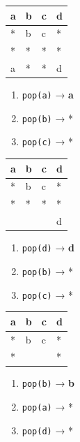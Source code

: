 \documentclass[11pt]{article}
\providecommand{\tightlist}{%
      \setlength{\itemsep}{0pt}\setlength{\parskip}{0pt}}
\begin{document}
\begin{longtable}[]{@{}llll@{}}
\toprule\noalign{}
a & b & c & d \\
\midrule\noalign{}
\endhead
\bottomrule\noalign{}
\endlastfoot
* & b & c & * \\
* & * & * & * \\
a & * & * & d \\
\end{longtable}

\begin{enumerate}
\def\labelenumi{\arabic{enumi}.}
\tightlist
\item
  \texttt{pop(a)} → \textbf{a}
\item
  \texttt{pop(b)} → *
\item
  \texttt{pop(c)} → *
\end{enumerate}

\begin{longtable}[]{@{}llll@{}}
\toprule\noalign{}
a & b & c & d \\
\midrule\noalign{}
\endhead
\bottomrule\noalign{}
\endlastfoot
* & b & c & * \\
* & * & * & * \\
& & & d \\
\end{longtable}

\begin{enumerate}
\def\labelenumi{\arabic{enumi}.}
\tightlist
\item
  \texttt{pop(d)} → \textbf{d}
\item
  \texttt{pop(b)} → *
\item
  \texttt{pop(c)} → *
\end{enumerate}

\begin{longtable}[]{@{}llll@{}}
\toprule\noalign{}
a & b & c & d \\
\midrule\noalign{}
\endhead
\bottomrule\noalign{}
\endlastfoot
* & b & c & * \\
* & & & * \\
\end{longtable}

\begin{enumerate}
\def\labelenumi{\arabic{enumi}.}
\tightlist
\item
  \texttt{pop(b)} → \textbf{b}
\item
  \texttt{pop(a)} → *
\item
  \texttt{pop(d)} → *
\end{enumerate}
\end{document}
